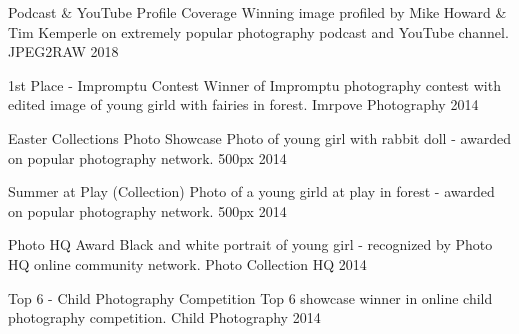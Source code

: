 


\begin{cvhonors}


\cvhonor
{Podcast \& YouTube Profile Coverage} %
{Winning image profiled by Mike Howard \& Tim Kemperle on extremely popular photography podcast and YouTube channel.} %
{JPEG2RAW} %
{2018} %

\cvhonor
{1st Place - Impromptu Contest} %
{Winner of Impromptu photography contest with edited image of young girld with fairies in forest.} %
{Imrpove Photography} %
{2014} %


\cvhonor
{Easter Collections Photo Showcase} %
{Photo of young girl with rabbit doll - awarded on popular photography network.} %
{500px} %
{2014} %

\cvhonor
{Summer at Play (Collection)} %
{Photo of a young girld at play in forest - awarded on popular photography network. } %
{500px} %
{2014} %

\cvhonor
{Photo HQ Award} %
{Black and white portrait of young girl - recognized by Photo HQ online community network.} %
{Photo Collection HQ} %
{2014} %

\cvhonor
{Top 6 - Child Photography Competition} %
{Top 6 showcase winner in online child photography competition.} %
{Child Photography} %
{2014} %



\end{cvhonors}